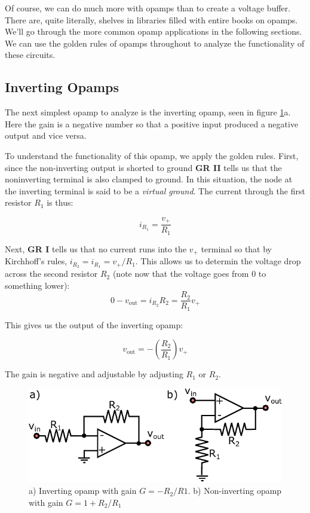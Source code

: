 \documentclass{tufte-book}
\begin{document}
Of course, we can do much more with opamps than to create a voltage buffer. There are, quite literally, shelves in libraries filled with entire books on opamps. We'll go through the more common opamp applications in the following sections. We can use the golden rules of opamps throughout to analyze the functionality of these circuits.

\subsection{Inverting Opamps}
The next simplest opamp to analyze is the inverting opamp, seen in figure \ref{fig:inv_noninv_opamps}a. Here the gain is a negative number so that a positive input produced a negative output and vice versa. 

To understand the functionality of this opamp, we apply the golden rules. First, since the non-inverting output is shorted to ground \textbf{GR II} tells us that the noninverting terminal is also clamped to ground. In this situation, the node at the inverting terminal is said to be a \textit{virtual ground}. The current through the first resistor $R_1$ is thus:

\begin{equation}
\label{eq:inverting_opamp_deriv_1}
i_{R_1} = \frac{v_+}{R_1}
\end{equation}

Next, \textbf{GR I} tells us that no current runs into the $v_+$ terminal so that by Kirchhoff's rules, $i_{R_2} = i_{R_1} = v_+/R_1$. This allows us to determin the voltage drop across the second resistor $R_2$ (note now that the voltage goes from 0 to something lower):
\begin{equation}
\label{eq:inverting_opamp_deriv_2}
0-v_\text{out} = i_{R_2}R_2 = \frac{R_2}{R_1}v_+
\end{equation}

This gives us the output of the inverting opamp:

\begin{equation}
\label{eq:inverting_opamp}
v_\text{out} = -\left(\frac{R_2}{R_1}\right)v_+
\end{equation}

The gain is negative and adjustable by adjusting $R_1$ or $R_2$.

\begin{figure}[ht]
\caption{a) Inverting opamp with gain $G=-R_2/R1$. b) Non-inverting opamp with gain $G = 1+R_2/R_1$}
\label{fig:inv_noninv_opamps}
	\begin{center}
		\includegraphics[]{Images/inv_noninv_opamps.pdf}
	\end{center}
\end{figure}
\end{document}
